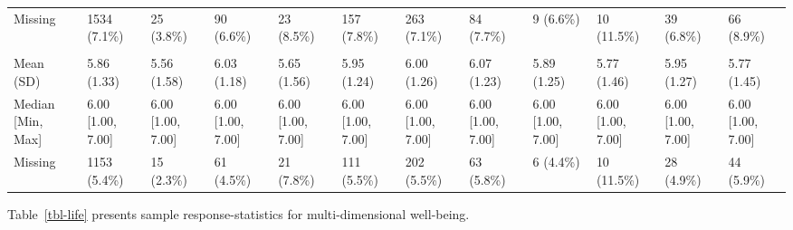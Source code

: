 \documentclass[
  single column]{article}
\begin{document}
\begin{landscape}
\begin{longtable}[t]{llllllllllll}
\hspace{1em}Missing & 1534 (7.1\%) & 25 (3.8\%) & 90 (6.6\%) & 23 (8.5\%) & 157 (7.8\%) & 263 (7.1\%) & 84 (7.7\%) & 9 (6.6\%) & 10 (11.5\%) & 39 (6.8\%) & 66 (8.9\%)\\
\addlinespace[0.3em]
\multicolumn{12}{l}{\textbf{Support - Someone to Turn To}}\\
\hspace{1em}Mean (SD) & 5.86 (1.33) & 5.56 (1.58) & 6.03 (1.18) & 5.65 (1.56) & 5.95 (1.24) & 6.00 (1.26) & 6.07 (1.23) & 5.89 (1.25) & 5.77 (1.46) & 5.95 (1.27) & 5.77 (1.45)\\
\hspace{1em}Median [Min, Max] & 6.00 [1.00, 7.00] & 6.00 [1.00, 7.00] & 6.00 [1.00, 7.00] & 6.00 [1.00, 7.00] & 6.00 [1.00, 7.00] & 6.00 [1.00, 7.00] & 6.00 [1.00, 7.00] & 6.00 [1.00, 7.00] & 6.00 [1.00, 7.00] & 6.00 [1.00, 7.00] & 6.00 [1.00, 7.00]\\
\hspace{1em}Missing & 1153 (5.4\%) & 15 (2.3\%) & 61 (4.5\%) & 21 (7.8\%) & 111 (5.5\%) & 202 (5.5\%) & 63 (5.8\%) & 6 (4.4\%) & 10 (11.5\%) & 28 (4.9\%) & 44 (5.9\%)\\*

\end{longtable}

\endgroup{}


\end{landscape}

\newpage{}

Table~\ref{tbl-life} presents sample response-statistics for
multi-dimensional well-being.
\end{document}
